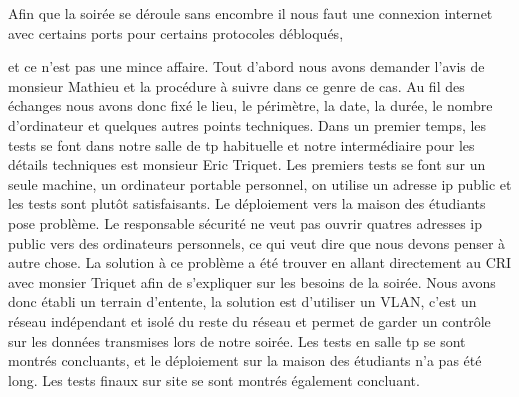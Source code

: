Afin que la soirée se déroule sans encombre il nous faut une connexion internet avec certains ports pour certains protocoles débloqués,

 et ce n'est pas une mince affaire. Tout d'abord nous avons demander l'avis de monsieur Mathieu et la procédure à suivre dans ce genre de cas.
Au fil des échanges nous avons donc fixé le lieu, le périmètre, la date, la durée, le nombre d'ordinateur et quelques autres points techniques.
Dans un premier temps, les tests se font dans notre salle de tp habituelle et notre intermédiaire pour les détails techniques est monsieur Eric Triquet.
Les premiers tests se font sur un seule machine, un ordinateur portable personnel, on utilise un adresse ip public et les tests sont plutôt satisfaisants.
Le déploiement vers la maison des étudiants pose problème. Le responsable sécurité ne veut pas ouvrir quatres adresses ip public vers des ordinateurs personnels,
 ce qui veut dire que nous devons penser à autre chose.
La solution à ce problème a été trouver en allant directement au CRI avec monsier Triquet afin de s'expliquer sur les besoins de la soirée.
Nous avons donc établi un terrain d'entente, la solution est d'utiliser un VLAN, c'est un réseau indépendant et isolé du reste du réseau et permet de garder
un contrôle sur les données transmises lors de notre soirée.
Les tests en salle tp se sont montrés concluants, et le déploiement sur la maison des étudiants n'a pas été long.
Les tests finaux sur site se sont montrés également concluant.
